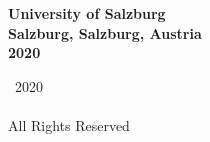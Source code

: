 

\thispagestyle{empty}

\begingroup
\centering
{}
~
\\[1em]
\sffamily\bfseries\fontsize{26}{31.2}\selectfont
\DocumentTitle
\\[0.4in]
\normalfont\large
\sffamily\bfseries\Large
\AuthorName
\vfill
University of Salzburg
\\[0.5em]
Salzburg, Salzburg, Austria
\\[1.5em]
2020
\par
\endgroup

\clearpage


\pagestyle{plain}
\setcounter{page}{2}

\begingroup
\centering
{}
\null
\vfill
{\sffamily\textcopyright}~2020
\\[0.5em]
\AuthorName
\\[0.5em]
All Rights Reserved
\par
\endgroup

\clearpage


%

